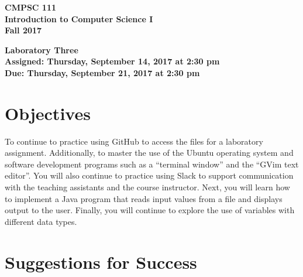 \documentclass[11pt]{article}
\newcommand{\assignmentduedate}{September 21}
\newcommand{\assignmentassignedate}{September 14}
\newcommand{\assignmentnumber}{Three}
\newcommand{\labyear}{2017}
\newcommand{\labday}{Thursday}
\newcommand{\labtime}{2:30 pm}
\newcommand{\assigneddate}{Assigned: \labday, \assignmentassignedate, \labyear{} at \labtime{}}
\newcommand{\duedate}{Due: \labday, \assignmentduedate, \labyear{} at \labtime{}}
\newcommand{\labtitle}[1]
{
  \begin{center}
    \begin{center}
      \bf
      CMPSC 111\\Introduction to Computer Science I\\
      Fall 2017\\
      \medskip
    \end{center}
    \bf
    #1
  \end{center}
}
\begin{document}
\thispagestyle{empty}

\labtitle{Laboratory \assignmentnumber{} \\ \assigneddate{} \\ \duedate{}}

\section*{Objectives}

To continue to practice using GitHub to access the files for a laboratory assignment. Additionally, to master the use of
the Ubuntu operating system and software development programs such as a ``terminal window'' and the ``GVim text
editor''. You will also continue to practice using Slack to support communication with the teaching assistants and the
course instructor. Next, you will learn how to implement a Java program that reads input values from a file and displays
output to the user. Finally, you will continue to explore the use of variables with different data types.

\section*{Suggestions for Success}
\end{document}
